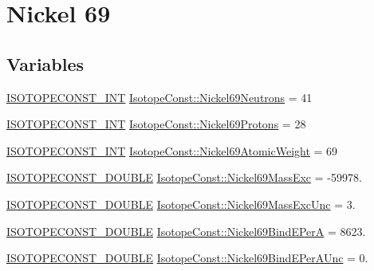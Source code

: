 \hypertarget{group___isotope_const-_nickel-_ni69}{}\section{Nickel 69}
\label{group___isotope_const-_nickel-_ni69}
\subsection*{Variables}
\begin{DoxyCompactItemize}
\item 
\mbox{\hyperlink{group___isotope_const-_macros_ga5f18360b3e99483a35c32d789e62621c}{I\+S\+O\+T\+O\+P\+E\+C\+O\+N\+S\+T\+\_\+\+I\+NT}} \mbox{\hyperlink{group___isotope_const-_nickel-_ni69_ga87dcac36cc46eddee7a694711498bc34}{Isotope\+Const\+::\+Nickel69\+Neutrons}} = 41
\item 
\mbox{\hyperlink{group___isotope_const-_macros_ga5f18360b3e99483a35c32d789e62621c}{I\+S\+O\+T\+O\+P\+E\+C\+O\+N\+S\+T\+\_\+\+I\+NT}} \mbox{\hyperlink{group___isotope_const-_nickel-_ni69_ga3e145e0180ff0fe65d764019458484a5}{Isotope\+Const\+::\+Nickel69\+Protons}} = 28
\item 
\mbox{\hyperlink{group___isotope_const-_macros_ga5f18360b3e99483a35c32d789e62621c}{I\+S\+O\+T\+O\+P\+E\+C\+O\+N\+S\+T\+\_\+\+I\+NT}} \mbox{\hyperlink{group___isotope_const-_nickel-_ni69_ga40603a38fda5542ac7696b42f20e1829}{Isotope\+Const\+::\+Nickel69\+Atomic\+Weight}} = 69
\item 
\mbox{\hyperlink{group___isotope_const-_macros_ga8f45a7272ce02c0b4c65c44636ed719a}{I\+S\+O\+T\+O\+P\+E\+C\+O\+N\+S\+T\+\_\+\+D\+O\+U\+B\+LE}} \mbox{\hyperlink{group___isotope_const-_nickel-_ni69_ga0e5cb0bf9b9eab6c7987b85a00522150}{Isotope\+Const\+::\+Nickel69\+Mass\+Exc}} = -\/59978.
\item 
\mbox{\hyperlink{group___isotope_const-_macros_ga8f45a7272ce02c0b4c65c44636ed719a}{I\+S\+O\+T\+O\+P\+E\+C\+O\+N\+S\+T\+\_\+\+D\+O\+U\+B\+LE}} \mbox{\hyperlink{group___isotope_const-_nickel-_ni69_ga402802963f0efa768935f7b3aa57fd4d}{Isotope\+Const\+::\+Nickel69\+Mass\+Exc\+Unc}} = 3.
\item 
\mbox{\hyperlink{group___isotope_const-_macros_ga8f45a7272ce02c0b4c65c44636ed719a}{I\+S\+O\+T\+O\+P\+E\+C\+O\+N\+S\+T\+\_\+\+D\+O\+U\+B\+LE}} \mbox{\hyperlink{group___isotope_const-_nickel-_ni69_ga8464e47c47c2955c20c8feed1a39b305}{Isotope\+Const\+::\+Nickel69\+Bind\+E\+PerA}} = 8623.
\item 
\mbox{\hyperlink{group___isotope_const-_macros_ga8f45a7272ce02c0b4c65c44636ed719a}{I\+S\+O\+T\+O\+P\+E\+C\+O\+N\+S\+T\+\_\+\+D\+O\+U\+B\+LE}} \mbox{\hyperlink{group___isotope_const-_nickel-_ni69_ga85a3eab7f931f54b91a550f919958bb0}{Isotope\+Const\+::\+Nickel69\+Bind\+E\+Per\+A\+Unc}} = 0.

\end{DoxyCompactItemize}
